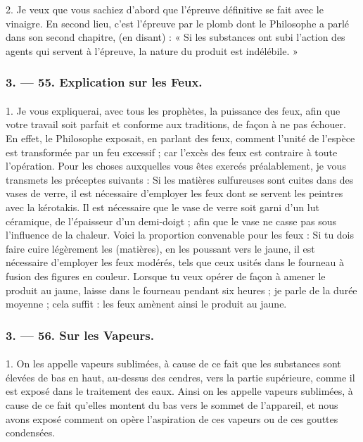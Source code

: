 \documentclass[landscape, a4paper, 11pt, oneside, polutonikogreek, french]{article}
\begin{document}
2. Je veux que vous sachiez d'abord que l'épreuve définitive se fait avec le vinaigre. En second lieu, c'est l'épreuve par le plomb dont le Philosophe a parlé dans son second chapitre, (en disant) : « Si les substances ont subi l'action des agents qui servent à l'épreuve, la nature du produit est indélébile. »
\clearpage
\bigskip
\centerline{\EightStarTaper}
\centerline{\EightStarTaper\EightStarTaper}
\bigskip

\subsubsection{3. --- 55. Explication sur les Feux.}
\paragraph{}
1. Je vous expliquerai, avec tous les prophètes, la puissance des feux, afin que votre travail soit parfait et conforme aux traditions, de façon à ne pas échouer. En effet, le Philosophe exposait, en parlant des feux, comment l'unité de l'espèce est transformée par un feu excessif ; car l'excès des feux est contraire à toute l'opération. Pour les choses auxquelles vous êtes exercés préalablement, je vous transmets les préceptes suivants : Si les matières sulfureuses sont cuites dans des vases de verre, il est nécessaire d'employer les feux dont se servent les peintres avec la kérotakis. Il est nécessaire que le vase de verre soit garni d'un lut céramique, de l'épaisseur d'un demi-doigt ; afin que le vase ne casse pas sous l'influence de la chaleur. Voici la proportion convenable pour les feux : Si tu dois faire cuire légèrement les (matières), en les poussant vers le jaune, il est nécessaire d'employer les feux modérés, tels que ceux usités dans le fourneau à fusion des figures en couleur. Lorsque tu veux opérer de façon à amener le produit au jaune, laisse dans le fourneau pendant six heures ; je parle de la durée moyenne ; cela suffit : les feux amènent ainsi le produit au jaune.

\bigskip
\centerline{\EightStarTaper}
\centerline{\EightStarTaper\EightStarTaper}
\bigskip

\subsubsection{3. --- 56. Sur les Vapeurs.}
\paragraph{}
1. On les appelle vapeurs sublimées, à cause de ce fait que les substances sont élevées de bas en haut, au-dessus des cendres, vers la partie supérieure, comme il est exposé dans le traitement des eaux. Ainsi on les appelle vapeurs sublimées, à cause de ce fait qu'elles montent du bas vers le sommet de l'appareil, et nous avons exposé comment on opère l'aspiration de ces vapeurs ou de ces gouttes condensées.
\end{document}
